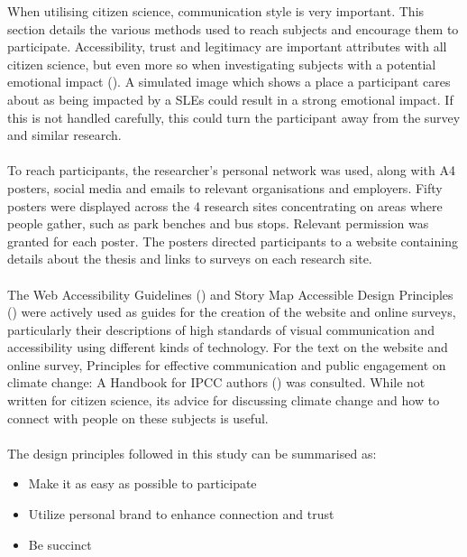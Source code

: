 When utilising citizen science, communication style is very important. This section details the various methods used to reach subjects and encourage them to participate. Accessibility, trust and legitimacy are important attributes with all citizen science, but even more so when investigating subjects with a potential emotional impact (\cite{tweddle_guide_2012}). A simulated image which shows a place a participant cares about as being impacted by a SLEs could result in a strong emotional impact. If this is not handled carefully, this could turn the participant away from the survey and similar research.
\paragraph{}

To reach participants, the researcher's personal network was used, along with A4 posters, social media and emails to relevant organisations and employers. Fifty posters were displayed across the 4 research sites concentrating on areas where people gather, such as park benches and bus stops. Relevant permission was granted for each poster. The posters directed participants to a website containing details about the thesis and links to surveys on each research site.
\paragraph{}

The Web Accessibility Guidelines (\cite{henry_web_2022}) and Story Map Accessible Design Principles (\cite{todd_liz_getting_nodate}) were actively used  as guides for the creation of the website and online surveys, particularly their descriptions of high standards of visual communication and accessibility using different kinds of technology. For the text on the website and online survey,  Principles for effective communication and public engagement on	climate change: A Handbook for IPCC authors (\cite{corner_a_principles_2018}) was consulted. While not written for citizen science, its advice for discussing climate change and how to connect with people on these subjects is useful. 
\paragraph{}

The design principles followed in this study can be summarised as:
\begin{itemize}
    \item Make it as easy as possible to participate
    \item Utilize personal brand to enhance connection and trust
    \item Be succinct
\end{itemize}
